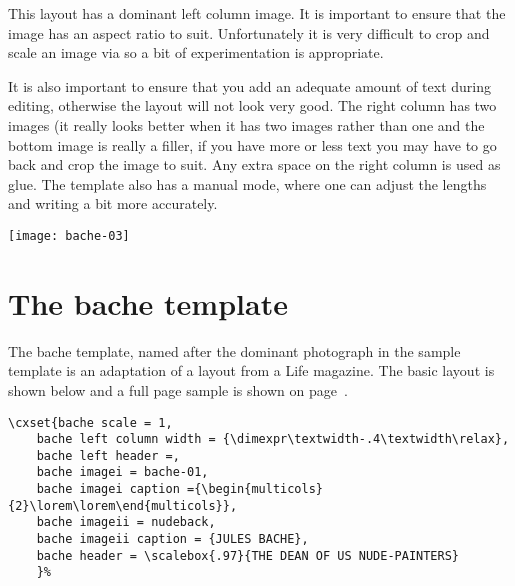 \begin{bache}
This layout has a dominant left column image. It is important to
ensure that the image has an aspect ratio to suit. Unfortunately
it is very difficult to crop and scale an image via \tex so a bit
of experimentation is appropriate.

It is also important to ensure that you add an adequate amount
of text during editing, otherwise the layout will not look very good. The right
column has two images (it really looks better when it has two images rather than
one and the bottom image is really a filler, if you have more or less
text you may have to go back and crop the image to suit. Any extra space on the right column is used as glue. The template also has a manual mode, where one can adjust the lengths and writing
a bit more accurately. \label{bache}

\vfill
\texttt{[image: bache-03]}
\end{bache}

\restoregeometry


\section{The bache template}
The bache template, named after the dominant photograph in the sample template
is an adaptation of a layout from a Life magazine. The basic layout is shown below and
a full page sample is shown on page~\pageref{bache}.

{\begin{center}


\end{center}
}

\begin{lstlisting}
\cxset{bache scale = 1,
    bache left column width = {\dimexpr\textwidth-.4\textwidth\relax},
    bache left header =,
    bache imagei = bache-01,
    bache imagei caption ={\begin{multicols}{2}\lorem\lorem\end{multicols}},
    bache imageii = nudeback,
    bache imageii caption = {JULES BACHE},
    bache header = \scalebox{.97}{THE DEAN OF US NUDE-PAINTERS}
    }%
\end{lstlisting}

